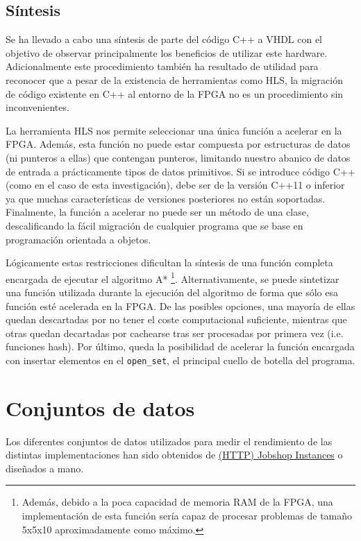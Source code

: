 \subsection{Síntesis}

Se ha llevado a cabo una síntesis de parte del código C++
a VHDL con el objetivo de observar principalmente los
beneficios de utilizar este hardware.
Adicionalmente este procedimiento también ha resultado
de utilidad para reconocer que a pesar de la existencia
de herramientas como HLS,
la migración de código existente en C++ al entorno de
la FPGA no es un procedimiento sin inconvenientes. 

La herramienta HLS nos permite seleccionar una única función
a acelerar en la FPGA.
Además, esta función no puede estar compuesta por
estructuras de datos (ni punteros a ellas)
que contengan punteros,
limitando nuestro abanico de datos de entrada a
prácticamente tipos de datos primitivos.
Si se introduce código C++ (como en el caso de esta
investigación), debe ser de la versión C++11 o inferior
ya que muchas características de versiones
posteriores no están soportadas.
Finalmente, la función a acelerar no puede ser un método
de una clase, descalificando la fácil migración
de cualquier programa que se base en programación orientada
a objetos.

Lógicamente estas restricciones dificultan la síntesis
de una función completa encargada de ejecutar el algoritmo A*
\footnote{Además, debido a la poca capacidad de memoria RAM
de la FPGA, una implementación de esta función sería capaz
de procesar problemas de tamaño 5x5x10 aproximadamente
como máximo.}.
Alternativamente, se puede sintetizar una función utilizada
durante la ejecución del algoritmo de forma que sólo esa función
esté acelerada en la FPGA.
De las posibles opciones, una mayoría de ellas quedan descartadas
por no tener el coste computacional suficiente,
mientras que otras quedan decartadas por cachearse
tras ser procesadas por primera vez (i.e. funciones hash).
Por último, queda la posibilidad de acelerar la función encargada
con insertar elementos en el \lstinline{open_set},
el principal cuello de botella del programa.

\section{Conjuntos de datos}

Los diferentes conjuntos de datos utilizados para medir el rendimiento
de las distintas implementaciones han sido obtenidos de
\href{http://jobshop.jjvh.nl/}{(HTTP) Jobshop Instances}
o diseñados a mano.

